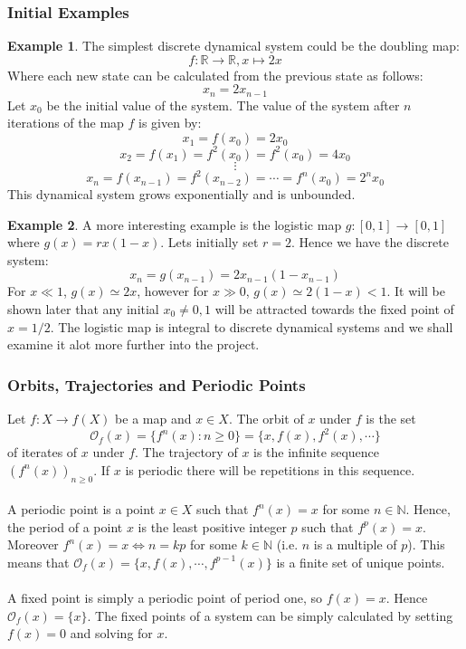 \documentclass[11pt]{article}
\theoremstyle{definition}
\newtheorem{exmp}{Example}[section]
\begin{document}
\subsubsection{Initial Examples}
\begin{exmp}
The simplest discrete dynamical system could be the doubling map: \[f : \mathbb{R} \to \mathbb{R}, x \mapsto 2x\] Where each new state can be calculated from the previous state as follows: \[x_n = 2x_{n-1}\] Let $x_0$ be the initial value of the system. The value of the system after $n$ iterations of the map $f$ is given by: \[x_1 = f(x_0) = 2x_0\] \[x_2 = f(x_1) = f^2(x_0) = f^2(x_0) = 4x_0\] \[\vdots\] \[x_n = f(x_{n-1}) = f^2(x_{n-2}) = \cdots = f^n(x_0) = 2^nx_0\] This dynamical system grows exponentially and is unbounded.
\end{exmp}

\begin{exmp}
    A more interesting example is the logistic map $g: [0,1] \to [0,1]$ where $g(x)=rx(1-x)$. Lets initially set $r = 2$. Hence we have the discrete system: \[x_n = g(x_{n-1}) = 2x_{n-1}(1 - x_{n-1})\] For $x \ll 1$, $g(x) \simeq 2x$, however for $x \gg 0$, $g(x) \simeq 2(1-x) < 1$. It will be shown later that any initial $x_0 \neq 0, 1$ will be attracted towards the fixed point of $x = 1/2$. The logistic map is integral to discrete dynamical systems and we shall examine it alot more further into the project.
\end{exmp}

\subsubsection{Orbits, Trajectories and Periodic Points}
Let $f: X \to f(X)$ be a map and $x \in X$. The orbit of $x$ under $f$ is the set \[\mathcal{O}_f(x) = \lbrace f^n(x) : n \geq 0 \rbrace = \lbrace x, f(x), f^2(x), \cdots \rbrace\] of iterates of $x$ under $f$. The trajectory of $x$ is the infinite sequence $(f^n(x))_{n \geq 0}$. If $x$ is periodic there will be repetitions in this sequence.
\\ \\
A periodic point is a point $x \in X$ such that $f^n(x) = x$ for some $n \in \mathbb{N}$. Hence, the period of a point $x$ is the least positive integer $p$ such that $f^p(x) = x$. Moreover $f^n(x) = x \iff n = kp$ for some $k \in \mathbb{N}$ (i.e. $n$ is a multiple of $p$). This means that $\mathcal{O}_f(x) = \lbrace x, f(x), \cdots, f^{p-1}(x) \rbrace$ is a finite set of unique points.
\\ \\ A fixed point is simply a periodic point of period one, so $f(x) = x$. Hence $\mathcal{O}_f(x) = \lbrace x \rbrace$. The fixed points of a system can be simply calculated by setting $f(x) = 0$ and solving for $x$.
\end{document}
